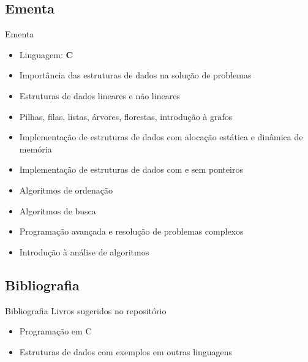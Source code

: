 \subsection{Ementa}

\begin{frame}{Ementa}
    \begin{itemize}
        \item Linguagem: \textbf{C}
        \item Importância das estruturas de dados na solução de problemas
        \item Estruturas de dados lineares e não lineares
        \item Pilhas, filas, listas, árvores, florestas, introdução à grafos
        \item Implementação de estruturas de dados com alocação estática e dinâmica de memória
        \item Implementação de estruturas de dados com e sem ponteiros
        \item Algoritmos de ordenação
        \item Algoritmos de busca
        \item Programação avançada e resolução de problemas complexos
        \item Introdução à análise de algoritmos
    \end{itemize}
\end{frame}

\subsection{Bibliografia}

\begin{frame}{Bibliografia}
    \huge
    Livros sugeridos no \alert{repositório}
    
    \Large
    \begin{itemize}
        \item Programação em C
        \item Estruturas de dados com exemplos em outras linguagens
    \end{itemize}
\end{frame}

